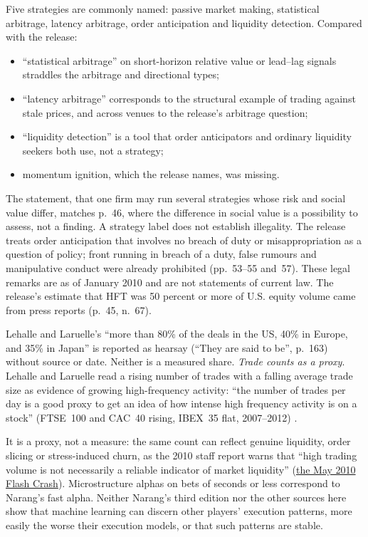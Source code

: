 \begin{qfdefinition}
 Five strategies are commonly named: passive market making, statistical arbitrage, latency arbitrage, order anticipation and liquidity detection. Compared with the release:
\begin{itemize}
\item ``statistical arbitrage'' on short-horizon relative value or lead--lag signals straddles the arbitrage and directional types;
\item ``latency arbitrage'' corresponds to the structural example of trading against stale prices, and across venues to the release's arbitrage question;
\item ``liquidity detection'' is a tool that order anticipators and ordinary liquidity seekers both use, not a strategy;
\item momentum ignition, which the release names, was missing.
\end{itemize}
The statement, that one firm may run several strategies whose risk and social value differ, matches p.~46, where the difference in social value is a possibility to assess, not a finding. A strategy label does not establish illegality. The release treats order anticipation that involves no breach of duty or misappropriation as a question of policy; front running in breach of a duty, false rumours and manipulative conduct were already prohibited (pp.~53--55 and~57). These legal remarks are as of January 2010 and are not statements of current law. The release's estimate that HFT was 50 percent or more of U.S. equity volume came from press reports (p.~45, n.~67).

Lehalle and Laruelle's ``more than 80\% of the deals in the US, 40\% in Europe, and 35\% in Japan'' is reported as hearsay (``They are said to be'', p.~163) without source or date. Neither is a measured share. \emph{Trade counts as a proxy}. Lehalle and Laruelle read a rising number of trades with a falling average trade size as evidence of growing high-frequency activity: ``the number of trades per day is a good proxy to get an idea of how intense high frequency activity is on a stock'' (FTSE~100 and CAC~40 rising, IBEX~35 flat, 2007--2012) \citep[sec.~2.5.1, pp.~170--171, Figure~2.25; introduction, pp.~20--21, Figure~5]{alpha-laruelle}.

It is a proxy, not a measure: the same count can reflect genuine liquidity, order slicing or stress-induced churn, as the 2010 staff report warns that ``high trading volume is not necessarily a reliable indicator of market liquidity'' (\hyperref[ev:may-2010-flash-crash]{the May 2010 Flash Crash}). Microstructure alphas on bets of seconds or less correspond to Narang's fast alpha. Neither Narang's third edition nor the other sources here show that machine learning can discern other players' execution patterns, more easily the worse their execution models, or that such patterns are stable.


\end{qfdefinition}
